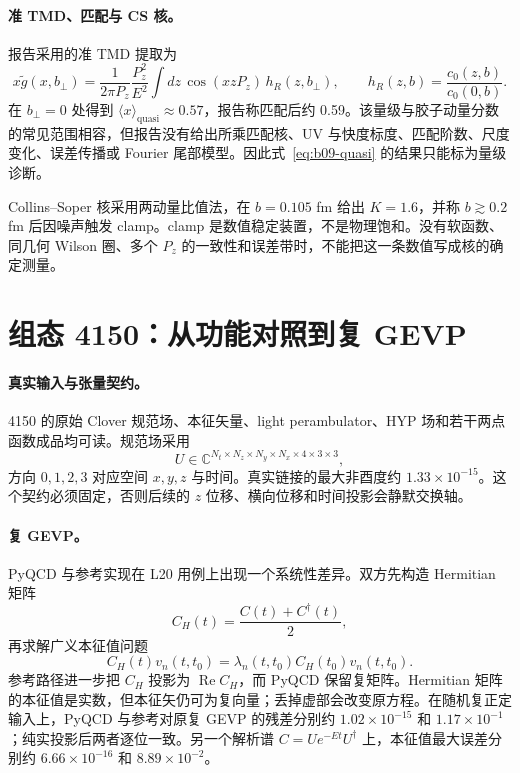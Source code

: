 \paragraph{准 TMD、匹配与 CS 核。}
报告采用的准 TMD 提取为
\begin{equation}
  x\widetilde g(x,b_\perp)
  =\frac{1}{2\pi P_z}\frac{P_z^2}{E^2}
  \int dz\,\cos(xzP_z)\,h_R(z,b_\perp),
  \qquad
  h_R(z,b)=\frac{c_0(z,b)}{c_0(0,b)}.
  \label{eq:b09-quasi}
\end{equation}
在 \(b_\perp=0\) 处得到 \(\langle x\rangle_{\mathrm{quasi}}\approx0.57\)，报告称匹配后约 0.59。该量级与胶子动量分数的常见范围相容，但报告没有给出所乘匹配核、UV 与快度标度、匹配阶数、尺度变化、误差传播或 Fourier 尾部模型。因此式~\eqref{eq:b09-quasi} 的结果只能标为量级诊断。

Collins--Soper 核采用两动量比值法，在 \(b=0.105\) fm 给出 \(K=1.6\)，并称 \(b\gtrsim0.2\) fm 后因噪声触发 clamp。clamp 是数值稳定装置，不是物理饱和。没有软函数、同几何 Wilson 圈、多个 \(P_z\) 的一致性和误差带时，不能把这一条数值写成核的确定测量。

\section{组态 4150：从功能对照到复 GEVP}
\label{subsec:b09-4150}

\paragraph{真实输入与张量契约。}
4150 的原始 Clover 规范场、本征矢量、light perambulator、HYP 场和若干两点函数成品均可读。规范场采用
\begin{equation}
  U\in\mathbb C^{N_t\times N_z\times N_y\times N_x\times4\times3\times3},
  \label{eq:b09-gauge-layout}
\end{equation}
方向 \(0,1,2,3\) 对应空间 \(x,y,z\) 与时间。真实链接的最大非酉度约 \(1.33\times10^{-15}\)。这个契约必须固定，否则后续的 \(z\) 位移、横向位移和时间投影会静默交换轴。

\paragraph{复 GEVP。}
PyQCD 与参考实现在 L20 用例上出现一个系统性差异。双方先构造 Hermitian 矩阵
\begin{equation}
  C_H(t)=\frac{C(t)+C^\dagger(t)}{2},
  \label{eq:b09-hermitize}
\end{equation}
再求解广义本征值问题
\begin{equation}
  C_H(t)v_n(t,t_0)=\lambda_n(t,t_0)C_H(t_0)v_n(t,t_0).
  \label{eq:b09-complex-gevp}
\end{equation}
参考路径进一步把 \(C_H\) 投影为 \(\operatorname{Re}C_H\)，而 PyQCD 保留复矩阵。Hermitian 矩阵的本征值是实数，但本征矢仍可为复向量；丢掉虚部会改变原方程。在随机复正定输入上，PyQCD 与参考对原复 GEVP 的残差分别约 \(1.02\times10^{-15}\) 和 \(1.17\times10^{-1}\)；纯实投影后两者逐位一致。另一个解析谱 \(C=Ue^{-Et}U^\dagger\) 上，本征值最大误差分别约 \(6.66\times10^{-16}\) 和 \(8.89\times10^{-2}\)。

